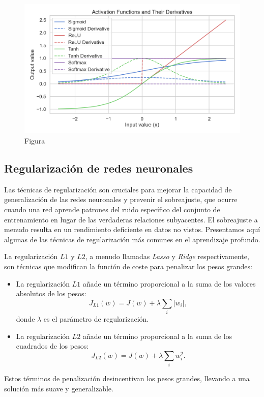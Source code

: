 \begin{figure}
	\centering
	\includegraphics[width=12cm]{img/activation_functions_figure.png}
	\caption{Figura}
\end{figure}

\subsection{Regularización de redes neuronales}

Las técnicas de regularización son cruciales para mejorar la capacidad de generalización de las redes neuronales y prevenir el sobreajuste, que ocurre cuando una red aprende patrones del ruido específico del conjunto de entrenamiento en lugar de las verdaderas relaciones subyacentes. El sobreajuste a menudo resulta en un rendimiento deficiente en datos no vistos. Presentamos aquí algunas de las técnicas de regularización más comunes en el aprendizaje profundo.

La regularización $L1$ y $L2$, a menudo llamadas \textit{Lasso} y \textit{Ridge} respectivamente, son técnicas que modifican la función de coste para penalizar los pesos grandes:
\begin{itemize}
	\item La regularización $L1$ añade un término proporcional a la suma de los valores absolutos de los pesos:
	\begin{equation}
		J_{L1}(w) = J(w) + \lambda \sum_{i} |w_i|,
	\end{equation}
	donde $\lambda$ es el parámetro de regularización.
	
	\item La regularización $L2$ añade un término proporcional a la suma de los cuadrados de los pesos:
	\begin{equation}
		J_{L2}(w) = J(w) + \lambda \sum_{i} w_i^2.
	\end{equation}
\end{itemize}
Estos términos de penalización desincentivan los pesos grandes, llevando a una solución más suave y generalizable.

